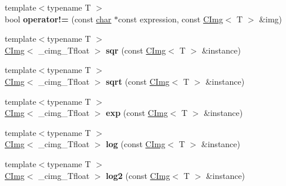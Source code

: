 \begin{DoxyCompactItemize}
{\footnotesize template$<$typename T $>$ }\\bool {\bfseries operator!=} (const \hyperlink{classchar}{char} $\ast$const expression, const \hyperlink{structcimg__library__suffixed_1_1CImg}{C\+Img}$<$ T $>$ \&img)
\item 
\mbox{\label{namespacecimg__library__suffixed_a9f2d45d4518cf844a541d397dc333842}} 
{\footnotesize template$<$typename T $>$ }\\\hyperlink{structcimg__library__suffixed_1_1CImg}{C\+Img}$<$ \+\_\+cimg\+\_\+\+Tfloat $>$ {\bfseries sqr} (const \hyperlink{structcimg__library__suffixed_1_1CImg}{C\+Img}$<$ T $>$ \&instance)
\item 
\mbox{\label{namespacecimg__library__suffixed_a00d0fd9a21d8d5e8a9fa4033593e6acf}} 
{\footnotesize template$<$typename T $>$ }\\\hyperlink{structcimg__library__suffixed_1_1CImg}{C\+Img}$<$ \+\_\+cimg\+\_\+\+Tfloat $>$ {\bfseries sqrt} (const \hyperlink{structcimg__library__suffixed_1_1CImg}{C\+Img}$<$ T $>$ \&instance)
\item 
\mbox{\label{namespacecimg__library__suffixed_adc3a62a5832fe41a2a16023ba04c8e64}} 
{\footnotesize template$<$typename T $>$ }\\\hyperlink{structcimg__library__suffixed_1_1CImg}{C\+Img}$<$ \+\_\+cimg\+\_\+\+Tfloat $>$ {\bfseries exp} (const \hyperlink{structcimg__library__suffixed_1_1CImg}{C\+Img}$<$ T $>$ \&instance)
\item 
\mbox{\label{namespacecimg__library__suffixed_a65baff382319a3677fd777a976a4f50b}} 
{\footnotesize template$<$typename T $>$ }\\\hyperlink{structcimg__library__suffixed_1_1CImg}{C\+Img}$<$ \+\_\+cimg\+\_\+\+Tfloat $>$ {\bfseries log} (const \hyperlink{structcimg__library__suffixed_1_1CImg}{C\+Img}$<$ T $>$ \&instance)
\item 
\mbox{\label{namespacecimg__library__suffixed_abab45e44322563e5c260c8a034d35039}} 
{\footnotesize template$<$typename T $>$ }\\\hyperlink{structcimg__library__suffixed_1_1CImg}{C\+Img}$<$ \+\_\+cimg\+\_\+\+Tfloat $>$ {\bfseries log2} (const \hyperlink{structcimg__library__suffixed_1_1CImg}{C\+Img}$<$ T $>$ \&instance)

\end{DoxyCompactItemize}
